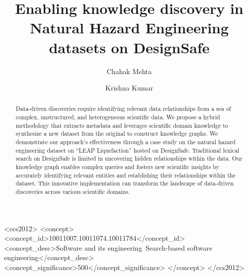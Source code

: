\documentclass[acmsmall]{acmart}
\begin{document}
\title[Enabling knowledge discovery in NHE]{Enabling knowledge discovery in Natural Hazard Engineering datasets on DesignSafe}

\author{Chahak Mehta}

\author{Krishna Kumar}


\begin{abstract}
Data-driven discoveries require identifying relevant data relationships from a sea of complex, unstructured, and heterogeneous scientific data. We propose a hybrid methodology that extracts metadata and leverages scientific domain knowledge to synthesize a new dataset from the original to construct knowledge graphs. We demonstrate our approach's effectiveness through a case study on the natural hazard engineering dataset on ``LEAP Liquefaction'' hosted on DesignSafe. Traditional lexical search on DesignSafe is limited in uncovering hidden relationships within the data.
Our knowledge graph enables complex queries and fosters new scientific insights by accurately identifying relevant entities and establishing their relationships within the dataset. This innovative implementation can transform the landscape of data-driven discoveries across various scientific domains.
\end{abstract}

\begin{CCSXML}
<ccs2012>
   <concept>
       <concept_id>10011007.10011074.10011784</concept_id>
       <concept_desc>Software and its engineering~Search-based software engineering</concept_desc>
       <concept_significance>500</concept_significance>
       </concept>
 </ccs2012>
\end{CCSXML}
\end{document}
